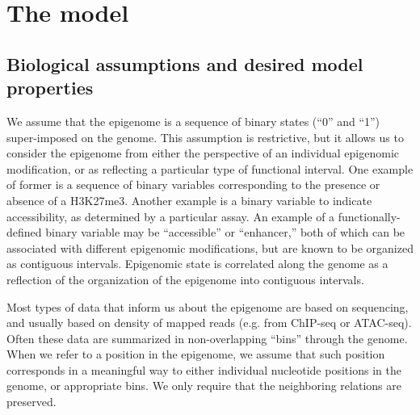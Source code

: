 \documentclass[11pt]{article}
\begin{document}
\section{The model}

\subsection{Biological assumptions and desired model properties}
\label{biodefs}

We assume that the epigenome is a sequence of binary states (``0'' and ``1'')
super-imposed on the genome. This assumption is restrictive, but it
allows us to consider the epigenome from either the perspective of an
individual epigenomic modification, or as reflecting a particular type
of functional interval. One example of former is a sequence of binary
variables corresponding to the presence or absence of a H3K27me3.
Another example is a binary variable to indicate accessibility, as
determined by a particular assay. An example of a functionally-defined
binary variable may be ``accessible'' or ``enhancer,'' both of which
can be associated with different epigenomic modifications, but are
known to be organized as contiguous intervals. Epigenomic state is
correlated along the genome as a reflection of the organization of the
epigenome into contiguous intervals.

Most types of data that inform us about the epigenome are based on
sequencing, and usually based on density of mapped reads (e.g. from
ChIP-seq or ATAC-seq). Often these data are summarized in
non-overlapping ``bins'' through the genome. When we refer to a
position in the epigenome, we assume that such position corresponds in
a meaningful way to either individual nucleotide positions
in the genome, or appropriate bins. We only require that the
neighboring relations are preserved.

\end{document}
